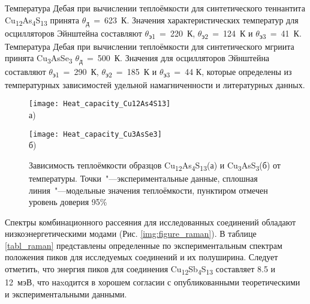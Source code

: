  Температура Дебая при вычислении теплоёмкости для синтетического теннантита Cu\textsubscript{12}As\textsubscript{4}S\textsubscript{13} принята $\theta$\textsubscript{д}~=~623~К. Значения характеристических температур для осцилляторов Эйнштейна составляют $\theta$\textsubscript{э1}~=~220~К, $\theta$\textsubscript{э2}~=~124~К и $\theta$\textsubscript{э3}~=~41~К.
Температура Дебая при вычислении теплоёмкости для синтетического мгриита принята Cu\textsubscript{3}AsSe\textsubscript{3} $\theta$\textsubscript{д}~=~500~К. Значения для осцилляторов Эйнштейна составляют $\theta$\textsubscript{э1}~=~290~К, $\theta$\textsubscript{э2}~=~185~К и $\theta$\textsubscript{э3}~=~44 К, которые определены из температурных зависимостей удельной намагниченности и литературных данных.

\begin{figure}[ht]
  \begin{minipage}[ht]{0.5\linewidth}\centering
    \texttt{[image: Heat\_capacity\_Cu12As4S13]} \\ а)
  \end{minipage}
  \hfill
  \begin{minipage}[ht]{0.5\linewidth}\centering
    \texttt{[image: Heat\_capacity\_Cu3AsSe3]} \\ б)
  \end{minipage}

      \caption[Зависимость теплоёмкости образцов Cu\textsubscript{12}As\textsubscript{4}S\textsubscript{13}(а) и Cu\textsubscript{3}AsS\textsubscript{3}(б) от температуры. Точки~"---экспериментальные данные, сплошная линия~"---модельные значения теплоёмкости, пунктиром отмечен уровень доверия 95\% ]{Зависимость теплоёмкости образцов Cu\textsubscript{12}As\textsubscript{4}S\textsubscript{13}(а) и Cu\textsubscript{3}AsS\textsubscript{3}(б) от температуры. Точки~"---экспериментальные данные, сплошная линия~"---модельные значения теплоёмкости, пунктиром отмечен уровень доверия 95\%}
    \label{img:figure4}
\end{figure}

Спектры комбинационного рассеяния для исследованных соединений обладают низкоэнергетическими модами (Рис. \ref{img:figure_raman}).
В таблице \ref{tabl_raman} представлены определенные по экспериментальным спектрам положения пиков для исследуемых соединений и их полуширина.
Следует отметить, что энергия пиков для соединения Cu\textsubscript{12}Sb\textsubscript{4}S\textsubscript{13} составляет 8.5  и 12~мэВ, что наxодится в хорошем согласии с опубликованными теоретическими\cite{Lai_2015} и экспериментальными\cite{May2016}  данными.

